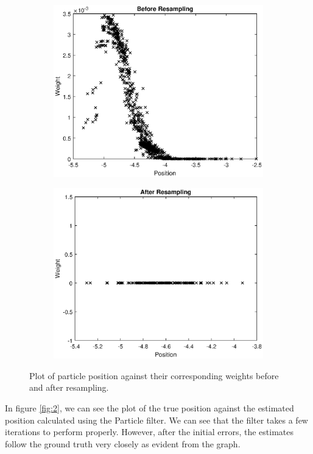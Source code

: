 \documentclass{article}
\begin{document}
\begin{figure}
\begin{subfigure}{0.6\textwidth}
    \includegraphics[scale=0.6]{before_sampling_3.eps}
\end{subfigure}%
\begin{subfigure}{0.6\textwidth}
    \centering
    \includegraphics[scale=0.6]{after_sampling_3.eps}
\end{subfigure}
\caption[short]{Plot of particle position against their corresponding weights before and after resampling.}
\end{figure}

In figure \ref{fig:2}, we can see the plot of the true position against the estimated position calculated using the Particle filter. We can see that the filter takes a few iterations to perform properly. However, after the initial errors, the estimates follow the ground truth very closely as evident from the graph.
\end{document}
